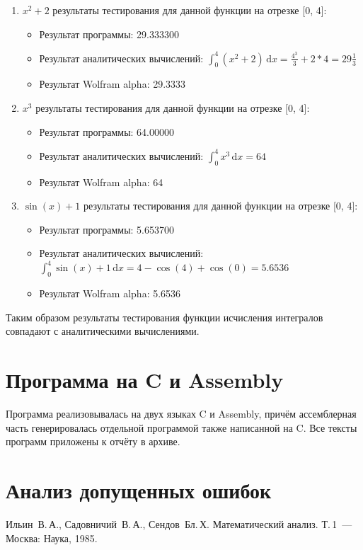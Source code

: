 \documentclass[a4paper,12pt,titlepage,finall]{article}
\begin{document}
\begin{enumerate}
  \item {$x^2+2$} результаты тестирования для данной функции на отрезке [0, 4]:
  \begin{itemize}
    \item Результат программы: 29.333300
    \item Результат аналитических вычислений: {$\int_0^4 \!(x^2+2)\, \mathrm{d}x=\frac{4^3}{3}+2*4=29\frac{1}{3}$}
    \item Результат Wolfram alpha: 29.3333
  \end{itemize}
  \item {$x^3$} результаты тестирования для данной функции на отрезке [0, 4]:
  \begin{itemize}
    \item Результат программы: 64.00000
    \item Результат аналитических вычислений: {$\int_0^4\!x^3\,\mathrm{d}x=64$}
    \item Результат Wolfram alpha: 64
  \end{itemize}
\item {$\sin(x)+1$} результаты тестирования для данной функции на отрезке [0, 4]:
  \begin{itemize}
    \item Результат программы: 5.653700
    \item Результат аналитических вычислений: {$\int_0^4\!\sin(x)+1\,\mathrm{d}x=4-\cos(4)+\cos(0)=5.6536$}
    \item Результат Wolfram alpha: 5.6536
  \end{itemize}
\end{enumerate}

Таким образом результаты тестирования функции исчисления интегралов совпадают с аналитическими вычислениями.

\newpage

\section{Программа на C и Assembly}

Программа реализовывалась на двух языках C и Assembly, причём ассемблерная часть генерировалась отдельной программой также написанной на C. Все тексты программ приложены к отчёту в архиве. 
\newpage

\section{Анализ допущенных ошибок}

\newpage
\begin{raggedright}
\begin{thebibliography}{99}
 Ильин~В.\,А., Садовничий~В.\,А., Сендов~Бл.\,Х. Математический анализ. Т.\,1~---
    Москва: Наука, 1985.
\end{thebibliography}
\end{raggedright}
\end{document}

